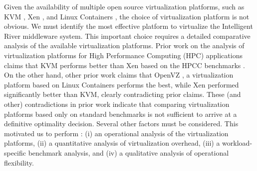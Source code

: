 Given the availability of multiple open source virtualization platforms, such as KVM \cite{kvm}, Xen \cite{xen}, and Linux Containers \cite{lxc}, the choice of virtualization platform is not obvious. We must identify the most effective platform to virtualize the Intelligent River\textsuperscript{\textregistered} middleware system. This important choice requires a detailed comparative analysis of the available virtualization platforms. Prior work on the analysis of virtualization platforms for High Performance Computing (HPC) applications \cite{younge2011analysis} claims that KVM performs better than Xen based on the HPCC benchmarks \cite{hpcc}. On the other hand, other prior work claims that OpenVZ \cite{openvz},  a virtualization platform based on Linux Containers performs the best, while Xen performed significantly better than KVM, clearly contradicting prior claims. These (and other) contradictions in prior work indicate that comparing virtualization platforms based only on standard benchmarks is not sufficient to arrive at a definitive optimality decision. Several other factors must be considered. This motivated us to perform : (i) an operational analysis of the virtualization platforms, (ii) a quantitative analysis of virtualization overhead, (iii) a workload-specific benchmark analysis, and (iv) a qualitative analysis of operational flexibility.


